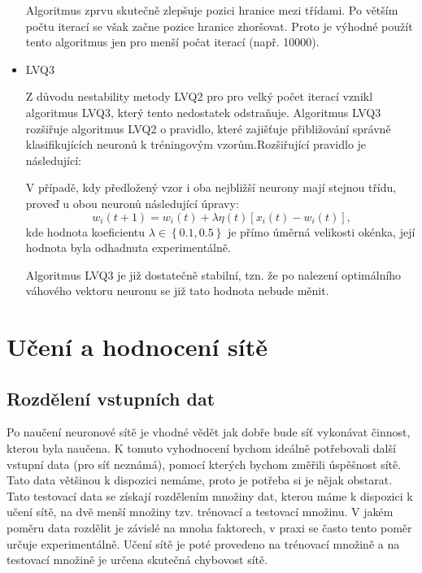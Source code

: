 \documentclass[11pt,twoside,a4paper]{book}
\begin{document}
\begin{itemize}
Algoritmus zprvu skutečně zlepšuje pozici hranice mezi třídami. Po větším počtu iterací se však začne pozice hranice zhoršovat. Proto je výhodné použít tento algoritmus jen pro menší počat iterací (např. 10000)\cite{courseware}.
\item LVQ3

Z důvodu nestability metody LVQ2 pro pro velký počet iterací vznikl algoritmus LVQ3, který tento nedostatek odstraňuje. Algoritmus LVQ3 rozšiřuje algoritmus LVQ2 o pravidlo, které zajišťuje přibližování správně klasifikujících neuronů k tréningovým vzorům.Rozšiřující pravidlo je následující:

V případě, kdy předložený vzor i oba nejbližší neurony mají stejnou třídu, proveď u obou neuronů následující úpravy:
\begin{equation}
w_{i}(t+1)=w_{i}(t)+\lambda \eta(t)\left[x_{i}(t)-w_{i}(t)\right]\mbox{,}
\end{equation}
kde hodnota koeficientu $\lambda\in\left\lbrace0.1,0.5\right\rbrace$ je přímo úměrná velikosti okénka, její hodnota byla odhadnuta experimentálně.\cite{skripta}

Algoritmus LVQ3 je již dostatečně stabilní, tzn. že po nalezení optimálního váhového vektoru neuronu se již tato hodnota nebude měnit.\cite{skripta}
\end{itemize}
\chapter{Učení a hodnocení sítě}
\section{Rozdělení vstupních dat}
Po naučení neuronové sítě je vhodné vědět jak dobře bude síť vykonávat činnost, kterou byla naučena. K tomuto vyhodnocení bychom ideálně potřebovali další vstupní data (pro síť neznámá), pomocí kterých bychom změřili úspěšnost sítě. Tato data většinou k dispozici nemáme, proto je potřeba si je nějak obstarat. Tato testovací data se získají rozdělením množiny dat, kterou máme k dispozici k učení sítě, na dvě menší množiny tzv. trénovací a testovací množinu. V jakém poměru data rozdělit je závislé na mnoha faktorech, v praxi se často tento poměr určuje experimentálně. Učení sítě je poté provedeno na trénovací množině a na testovací množině je určena skutečná chybovost sítě.
\end{document}
